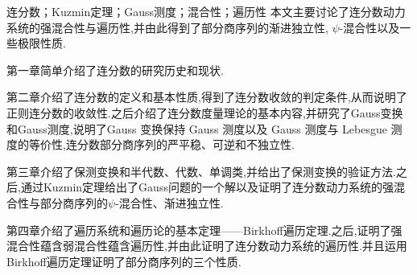 \begin{cnabstract}{连分数；Kuzmin定理；Gauss测度；混合性；遍历性}
    \hspace{2em}
    本文主要讨论了连分数动力系统的强混合性与遍历性,并由此得到了部分商序列的渐进独立性, $\psi$-混合性以及一些极限性质.\par
    第一章简单介绍了连分数的研究历史和现状.\par
    第二章介绍了连分数的定义和基本性质,得到了连分数收敛的判定条件,从而说明了正则连分数的收敛性.之后介绍了连分数度量理论的基本内容,并研究了Gauss变换和Gauss测度,说明了Gauss 变换保持 Gauss 测度以及 Gauss 测度与 Lebesgue 测度的等价性,连分数部分商序列的严平稳、可逆和不独立性.\par
    第三章介绍了保测变换和半代数、代数、单调类,并给出了保测变换的验证方法.之后,通过Kuzmin定理给出了Gauss问题的一个解以及证明了连分数动力系统的强混合性与部分商序列的$\psi$-混合性、渐进独立性.\par
    第四章介绍了遍历系统和遍历论的基本定理——Birkhoff遍历定理.之后,证明了强混合性蕴含弱混合性蕴含遍历性,并由此证明了连分数动力系统的遍历性.并且运用Birkhoff遍历定理证明了部分商序列的三个性质.

\end{cnabstract}